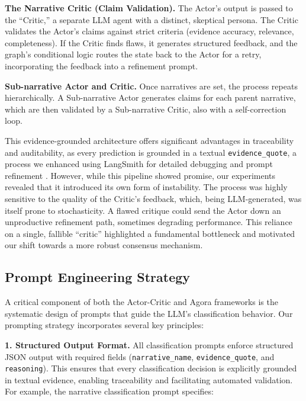 \textbf{The Narrative Critic (Claim Validation).}
The Actor's output is passed to the ``Critic,'' a separate LLM agent with a distinct, skeptical persona. The Critic validates the Actor's claims against strict criteria (evidence accuracy, relevance, completeness). If the Critic finds flaws, it generates structured feedback, and the graph's conditional logic routes the state back to the Actor for a retry, incorporating the feedback into a refinement prompt.

\textbf{Sub-narrative Actor and Critic.}
Once narratives are set, the process repeats hierarchically. A Sub-narrative Actor generates claims for each parent narrative, which are then validated by a Sub-narrative Critic, also with a self-correction loop.

This evidence-grounded architecture offers significant advantages in traceability and auditability, as every prediction is grounded in a textual \texttt{evidence\_quote}, a process we enhanced using LangSmith for detailed debugging and prompt refinement \citep{langsmith2024}. However, while this pipeline showed promise, our experiments revealed that it introduced its own form of instability. The process was highly sensitive to the quality of the Critic's feedback, which, being LLM-generated, was itself prone to stochasticity. A flawed critique could send the Actor down an unproductive refinement path, sometimes degrading performance. This reliance on a single, fallible ``critic'' highlighted a fundamental bottleneck and motivated our shift towards a more robust consensus mechanism.

\subsection{Prompt Engineering Strategy}

A critical component of both the Actor-Critic and Agora frameworks is the systematic design of prompts that guide the LLM's classification behavior. Our prompting strategy incorporates several key principles:

\noindent\textbf{1. Structured Output Format.} 
All classification prompts enforce structured JSON output with required fields (\texttt{narrative\_name}, \texttt{evidence\_quote}, and \texttt{reasoning}). 
This ensures that every classification decision is explicitly grounded in textual evidence, enabling traceability and facilitating automated validation. For example, the narrative classification prompt specifies:

